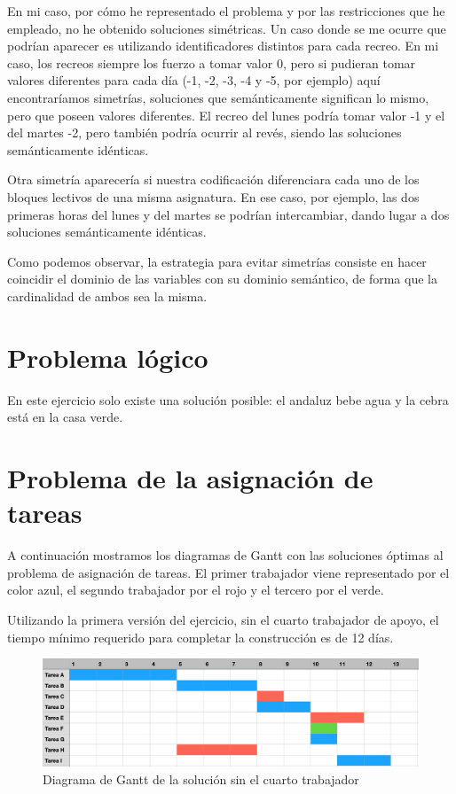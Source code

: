 \documentclass[12pt]{article} %
\begin{document}
En mi caso, por cómo he representado el problema y por las restricciones que he empleado, no he obtenido soluciones simétricas. Un caso donde se me ocurre que podrían aparecer es utilizando identificadores distintos para cada recreo. En mi caso, los recreos siempre los fuerzo a tomar valor 0, pero si pudieran tomar valores diferentes para cada día (-1, -2, -3, -4 y -5, por ejemplo) aquí encontraríamos simetrías, soluciones que semánticamente significan lo mismo, pero que poseen valores diferentes. El recreo del lunes podría tomar valor -1 y el del martes -2, pero también podría ocurrir al revés, siendo las soluciones semánticamente idénticas.

Otra simetría aparecería si nuestra codificación diferenciara cada uno de los bloques lectivos de una misma asignatura. En ese caso, por ejemplo, las dos primeras horas del lunes y del martes se podrían intercambiar, dando lugar a dos soluciones semánticamente idénticas.

Como podemos observar, la estrategia para evitar simetrías consiste en hacer coincidir el dominio de las variables con su dominio semántico, de forma que la cardinalidad de ambos sea la misma.

\section{Problema lógico}
En este ejercicio solo existe una solución posible: el andaluz bebe agua y la cebra está en la casa verde.

\section{Problema de la asignación de tareas}
A continuación mostramos los diagramas de Gantt con las soluciones óptimas al problema de asignación de tareas. El primer trabajador viene representado por el color azul, el segundo trabajador por el rojo y el tercero por el verde.

Utilizando la primera versión del ejercicio, sin el cuarto trabajador de apoyo, el tiempo mínimo requerido para completar la construcción es de 12 días.

\begin{figure}[H] %
    \centering
        \includegraphics[scale=0.32]{gantt.png}
        \caption{Diagrama de Gantt de la solución sin el cuarto trabajador}
\end{figure}
\end{document}
